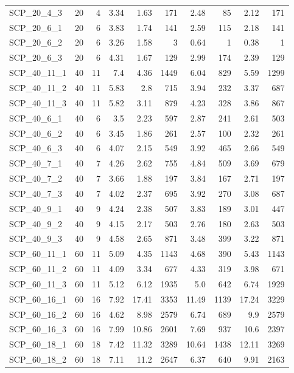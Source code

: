 \begin{center}
\begin{scriptsize}
\begin{longtable}{lrrrrrrrrr}
SCP\_20\_4\_3 & 20 & 4 & 3.34 & 1.63 & 171 & 2.48 & 85 & 2.12 & 171\\
SCP\_20\_6\_1 & 20 & 6 & 3.83 & 1.74 & 141 & 2.59 & 115 & 2.18 & 141\\
SCP\_20\_6\_2 & 20 & 6 & 3.26 & 1.58 & 3 & 0.64 & 1 & 0.38 & 1\\
SCP\_20\_6\_3 & 20 & 6 & 4.31 & 1.67 & 129 & 2.99 & 174 & 2.39 & 129\\
SCP\_40\_11\_1 & 40 & 11 & 7.4 & 4.36 & 1449 & 6.04 & 829 & 5.59 & 1299\\
SCP\_40\_11\_2 & 40 & 11 & 5.83 & 2.8 & 715 & 3.94 & 232 & 3.37 & 687\\
SCP\_40\_11\_3 & 40 & 11 & 5.82 & 3.11 & 879 & 4.23 & 328 & 3.86 & 867\\
SCP\_40\_6\_1 & 40 & 6 & 3.5 & 2.23 & 597 & 2.87 & 241 & 2.61 & 503\\
SCP\_40\_6\_2 & 40 & 6 & 3.45 & 1.86 & 261 & 2.57 & 100 & 2.32 & 261\\
SCP\_40\_6\_3 & 40 & 6 & 4.07 & 2.15 & 549 & 3.92 & 465 & 2.66 & 549\\
SCP\_40\_7\_1 & 40 & 7 & 4.26 & 2.62 & 755 & 4.84 & 509 & 3.69 & 679\\
SCP\_40\_7\_2 & 40 & 7 & 3.66 & 1.88 & 197 & 3.84 & 167 & 2.71 & 197\\
SCP\_40\_7\_3 & 40 & 7 & 4.02 & 2.37 & 695 & 3.92 & 270 & 3.08 & 687\\
SCP\_40\_9\_1 & 40 & 9 & 4.24 & 2.38 & 507 & 3.83 & 189 & 3.01 & 447\\
SCP\_40\_9\_2 & 40 & 9 & 4.15 & 2.17 & 503 & 2.76 & 180 & 2.63 & 503\\
SCP\_40\_9\_3 & 40 & 9 & 4.58 & 2.65 & 871 & 3.48 & 399 & 3.22 & 871\\
SCP\_60\_11\_1 & 60 & 11 & 5.09 & 4.35 & 1143 & 4.68 & 390 & 5.43 & 1143\\
SCP\_60\_11\_2 & 60 & 11 & 4.09 & 3.34 & 677 & 4.33 & 319 & 3.98 & 671\\
SCP\_60\_11\_3 & 60 & 11 & 5.12 & 6.12 & 1935 & 5.0 & 642 & 6.74 & 1929\\
SCP\_60\_16\_1 & 60 & 16 & 7.92 & 17.41 & 3353 & 11.49 & 1139 & 17.24 & 3229\\
SCP\_60\_16\_2 & 60 & 16 & 4.62 & 8.98 & 2579 & 6.74 & 689 & 9.9 & 2579\\
SCP\_60\_16\_3 & 60 & 16 & 7.99 & 10.86 & 2601 & 7.69 & 937 & 10.6 & 2397\\
SCP\_60\_18\_1 & 60 & 18 & 7.42 & 11.32 & 3289 & 10.64 & 1438 & 12.11 & 3269\\
SCP\_60\_18\_2 & 60 & 18 & 7.11 & 11.2 & 2647 & 6.37 & 640 & 9.91 & 2163\\

\end{longtable}
\end{scriptsize}
\end{center}

